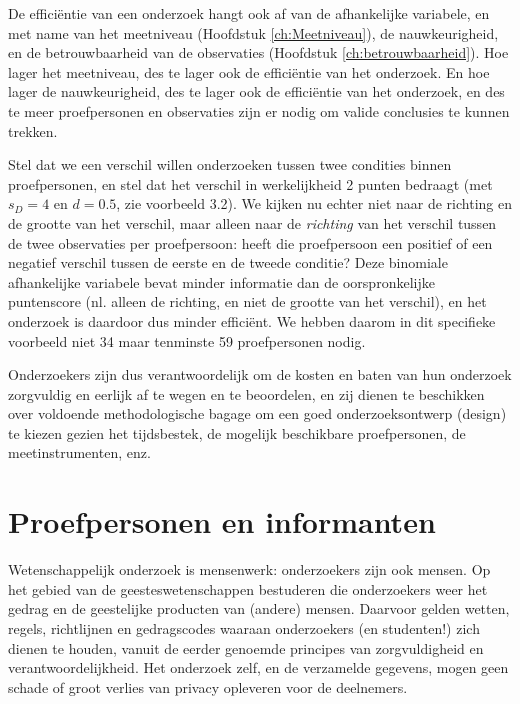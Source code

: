 \documentclass[
]{book}
\begin{document}
De efficiëntie van een onderzoek hangt ook af van de afhankelijke
variabele, en met name van het meetniveau
(Hoofdstuk \ref{ch:Meetniveau}), de nauwkeurigheid, en de betrouwbaarheid
van de observaties
(Hoofdstuk \ref{ch:betrouwbaarheid}). Hoe lager het meetniveau, des te lager
ook de efficiëntie van het onderzoek. En hoe lager de nauwkeurigheid,
des te lager ook de efficiëntie van het onderzoek, en des te meer
proefpersonen en observaties zijn er nodig om valide conclusies te
kunnen trekken.

Stel dat we een verschil willen onderzoeken tussen twee condities binnen
proefpersonen, en stel dat het verschil in werkelijkheid 2 punten
bedraagt (met \(s_D=4\) en \(d=0.5\), zie
voorbeeld 3.2). We kijken nu echter niet naar de richting en
de grootte van het verschil, maar alleen naar de \emph{richting} van het
verschil tussen de twee observaties per proefpersoon: heeft die
proefpersoon een positief of een negatief verschil tussen de eerste en
de tweede conditie? Deze binomiale afhankelijke variabele bevat minder
informatie dan de oorspronkelijke puntenscore (nl. alleen de richting,
en niet de grootte van het verschil), en het onderzoek is daardoor dus
minder efficiënt. We hebben daarom in dit specifieke voorbeeld niet 34
maar tenminste 59 proefpersonen nodig.

Onderzoekers zijn dus verantwoordelijk om de kosten en baten van hun
onderzoek zorgvuldig en eerlijk af te wegen en te beoordelen, en zij
dienen te beschikken over voldoende methodologische bagage om een goed
onderzoeksontwerp (design) te kiezen gezien het tijdsbestek, de mogelijk
beschikbare proefpersonen, de meetinstrumenten, enz.

\hypertarget{proefpersonen-en-informanten}{%
\section{Proefpersonen en informanten}\label{proefpersonen-en-informanten}}

Wetenschappelijk onderzoek is mensenwerk: onderzoekers zijn ook mensen.
Op het gebied van de geesteswetenschappen bestuderen die onderzoekers
weer het gedrag en de geestelijke producten van (andere) mensen.
Daarvoor gelden wetten, regels, richtlijnen en gedragscodes waaraan
onderzoekers (en studenten!) zich dienen te houden, vanuit de eerder
genoemde principes van zorgvuldigheid en verantwoordelijkheid. Het
onderzoek zelf, en de verzamelde gegevens, mogen geen schade of groot
verlies van privacy opleveren voor de deelnemers.
\end{document}
